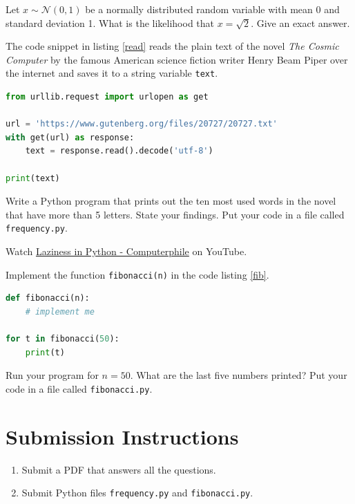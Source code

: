 \documentclass{homework}
\begin{document}

\question Let $x \sim \mathcal{N}(0, 1)$ be a normally distributed random
variable with mean 0 and standard deviation 1. What is the
likelihood that $x=\sqrt{2}$. Give an exact answer.


\question The code snippet in listing \ref{read} reads the plain text of the
novel \textit{The Cosmic Computer} by the famous American science
fiction writer Henry Beam Piper over the internet and saves it to
a string variable \texttt{text}.

\begin{lstlisting}[language=python, label=read, caption={A Python program to download the text of the \textit{The Cosmic Computer} by Piper.}]
from urllib.request import urlopen as get

url = 'https://www.gutenberg.org/files/20727/20727.txt'
with get(url) as response:
    text = response.read().decode('utf-8')

print(text)
\end{lstlisting}

Write a Python program that prints out the ten most used words in
the novel that have more than 5 letters. State your findings. Put
your code in a file called \texttt{frequency.py}.


\question Watch \href{https://www.youtube.com/watch?v=5jwV3zxXc8E}{Laziness
  in Python - Computerphile} on YouTube.

Implement the function \texttt{fibonacci(n)} in the code listing
\ref{fib}.

\begin{lstlisting}[language=python, label=fib, caption={A Python 3 program to print out the first $n \geq 0$ Fibonacci numbers.}]
def fibonacci(n):
    # implement me

for t in fibonacci(50):
    print(t)
\end{lstlisting}

Run your program for $n=50$. What are the last five numbers
printed? Put your code in a file called \texttt{fibonacci.py}.


\section*{Submission Instructions}

\begin{enumerate}
  \item Submit a PDF that answers all the questions.
  \item Submit Python files \eg \texttt{frequency.py} and
        \texttt{fibonacci.py}.
\end{enumerate}
\end{document}
